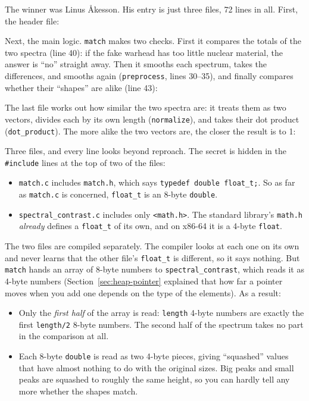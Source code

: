 The winner was Linus Åkesson. His entry is just three files, 72 lines in all. First, the header file:


Next, the main logic. \texttt{match} makes two checks. First it compares the totals of the two spectra (line 40): if the fake warhead has too little nuclear material, the answer is ``no'' straight away. Then it smooths each spectrum, takes the differences, and smooths again (\texttt{preprocess}, lines 30--35), and finally compares whether their ``shapes'' are alike (line 43):


The last file works out how similar the two spectra are: it treats them as two vectors, divides each by its own length (\texttt{normalize}), and takes their dot product (\texttt{dot\_product}). The more alike the two vectors are, the closer the result is to 1:


Three files, and every line looks beyond reproach. The secret is hidden in the \texttt{\#include} lines at the top of two of the files:
\begin{itemize}
  \item \texttt{match.c} includes \texttt{match.h}, which says \texttt{typedef double float\_t;}. So as far as \texttt{match.c} is concerned, \texttt{float\_t} is an 8-byte \texttt{double}.
  \item \texttt{spectral\_contrast.c} includes only \texttt{<math.h>}. The standard library's \texttt{math.h} \emph{already} defines a \texttt{float\_t} of its own, and on x86-64 it is a 4-byte \texttt{float}.
\end{itemize}
The two files are compiled separately. The compiler looks at each one on its own and never learns that the other file's \texttt{float\_t} is different, so it says nothing. But \texttt{match} hands an array of 8-byte numbers to \texttt{spectral\_contrast}, which reads it as 4-byte numbers (Section~\ref{sec:heap-pointer} explained that how far a pointer moves when you add one depends on the type of the elements). As a result:
\begin{itemize}
  \item Only the \emph{first half} of the array is read: \texttt{length} 4-byte numbers are exactly the first \texttt{length/2} 8-byte numbers. The second half of the spectrum takes no part in the comparison at all.
  \item Each 8-byte \texttt{double} is read as two 4-byte pieces, giving ``squashed'' values that have almost nothing to do with the original sizes. Big peaks and small peaks are squashed to roughly the same height, so you can hardly tell any more whether the shapes match.
\end{itemize}

